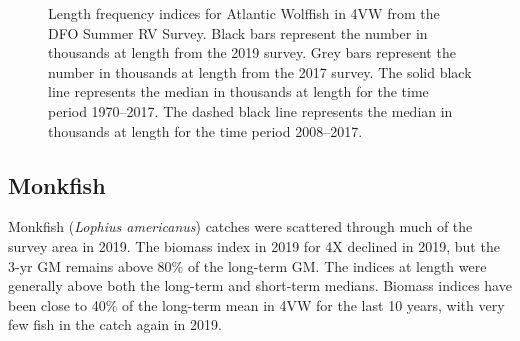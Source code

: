 \documentclass[11pt]{book}
\begin{document}
\begin{figure}[htb]

{\centering {} 

}

\caption{Length frequency indices for Atlantic Wolffish in 4VW from the DFO Summer RV Survey. Black bars represent the number in thousands at length from the 2019 survey. Grey bars represent the number in thousands at length from the 2017 survey. The solid black line represents the median in thousands at length for the time period 1970--2017. The dashed black line represents the median in thousands at length for the time period 2008--2017.}\label{fig:69-fig-awolffish-lengthfreq4VW}
\end{figure}
\clearpage

\hypertarget{monkfish}{%
\subsection{Monkfish}\label{monkfish}}

Monkfish (\emph{Lophius americanus}) catches were scattered through much of the survey area in 2019. The biomass index in 2019 for 4X declined in 2019, but the 3-yr GM remains above 80\% of the long-term GM. The indices at length were generally above both the long-term and short-term medians. Biomass indices have been close to 40\% of the long-term mean in 4VW for the last 10 years, with very few fish in the catch again in 2019.
\end{document}
